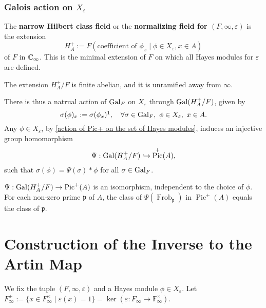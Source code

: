 \documentclass{article}
\newcommand{\F}{\mathbb{F}}
\DeclareMathOperator{\pic}{Pic}
\DeclareMathOperator{\frob}{Frob}
\begin{document}
\subsubsection{Galois action on \texorpdfstring{$X_\varepsilon$}{Xepsilon}}
The \textbf{narrow Hilbert class field} or the \textbf{normalizing field for $(F, \infty, \varepsilon)$} is the extension \[H_A^+ := F\left( \text{coefficient of }\phi_x\mid \phi\in X_\varepsilon, x\in A \right)\]
of $F$ in $\mathbb{C}_\infty$. This is the minimal extension of $F$ on which all Hayes modules for $\varepsilon$ are defined.
\begin{proposition}\label{narrow Hilbert class field is unramified outside infty}
    The extension $H_A^+/F$ is finite abelian, and it is unramified away from $\infty$.
\end{proposition}
There is thus a natrual action of $\operatorname{Gal}_F$ on $X_\varepsilon$ through $\operatorname{Gal}(H_A^+/F)$, given by \[\sigma(\phi)_x := \sigma(\phi_x)\footnotemark,\quad \forall\sigma\in\gal_F,\ \phi\in X_\varepsilon,\ x\in A.\]
Any $\phi\in X_\varepsilon$, by \cref{action of Pic+ on the set of Hayes modules}, induces an injective group homomorphism
\[\Psi : \gal(H_A^+/F)\inject \pic^+(A),\]
such that $\sigma(\phi) = \Psi(\sigma) * \phi$ for all $\sigma\in\operatorname{Gal}_F$.

\begin{proposition}\label{the isomophism from gal to Pic+ and the value of Frobenius under this isomophism}
    $\Psi : \gal(H_A^+/F)\to \pic^+(A)$ is an isomorphism, independent to the choice of $\phi$.
    For each non-zero prime $\mathfrak{p}$ of $A$,
    the class of $\Psi(\frob_\mathfrak{p})$ in $\pic^+(A)$ equals the class of $\mathfrak{p}$.
\end{proposition}



\section{Construction of the Inverse to the Artin Map}
We fix the tuple $(F, \infty, \varepsilon)$
and a Hayes module $\phi\in X_\varepsilon$.
Let $F_\infty^+ := \{x\in F_\infty^\times\mid \varepsilon(x) = 1\} = \ker(\varepsilon : F_\infty\to \F_\infty^\times)$.
\end{document}
